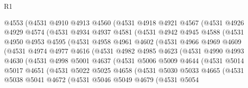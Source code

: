 \begin{lexlean}{R1}
\begin{coremodule}
          @4553
          (@4531
            @4910
            @4913
            @4560
            (@4531
              @4918
              @4921
              @4567
              (@4531
                @4926
                @4929
                @4574
                (@4531
                  @4934
                  @4937
                  @4581
                  (@4531
                    @4942
                    @4945
                    @4588
                    (@4531
                      @4950
                      @4953
                      @4595
                      (@4531
                        @4958
                        @4961
                        @4602
                        (@4531
                          @4966
                          @4969
                          @4609
                          (@4531
                            @4974
                            @4977
                            @4616
                            (@4531
                              @4982
                              @4985
                              @4623
                              (@4531
                                @4990
                                @4993
                                @4630
                                (@4531
                                  @4998
                                  @5001
                                  @4637
                                  (@4531
                                    @5006
                                    @5009
                                    @4644
                                    (@4531
                                      @5014
                                      @5017
                                      @4651
                                      (@4531
                                        @5022
                                        @5025
                                        @4658
                                        (@4531
                                          @5030
                                          @5033
                                          @4665
                                          (@4531
                                            @5038
                                            @5041
                                            @4672
                                            (@4531
                                              @5046
                                              @5049
                                              @4679
                                              (@4531
                                                @5054

\end{coremodule}
\end{lexlean}
